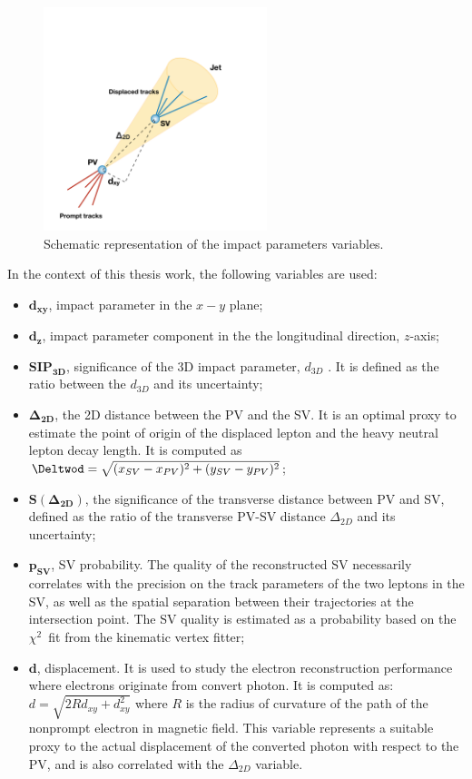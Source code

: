 \begin{figure}[h!]
\centering
  \includegraphics[clip,trim=1cm 0cm 3cm 4cm, width=0.58\textwidth]{Figures/c2/grafico.pdf}
  \caption{Schematic representation of the impact parameters variables.}
  \label{fig:impact}
\end{figure}

In the context of this thesis work, the following variables are used:
\begin{itemize}
\item $\boldsymbol{d_{xy}}$, impact parameter in the $x-y$ plane;
\item $\boldsymbol{d_z}$, impact parameter component in the the
  longitudinal direction, $z$-axis;
\item $\boldsymbol{SIP_{3D}}$, significance of the 3D impact parameter, $d_{3D}$
 . It is defined as the ratio between the $d_{3D}$ and its
  uncertainty; 
\item $\boldsymbol{\Delta_{2D}}$, the 2D distance between the PV and
  the SV. It is an optimal proxy to estimate the point of origin of the
displaced lepton and the heavy neutral lepton decay length. It is
computed as $\Deltwod = \sqrt{(x_{SV}-x_{PV})^{2} + (y_{SV}-y_{PV})^{2}}$;
\item $\boldsymbol{ S(\Delta_{2D})}$, the significance of the transverse distance
  between PV and SV, defined as the ratio of the transverse PV-SV
  distance $\Delta_{2D}$ and its uncertainty;
\item $\boldsymbol{ p_{SV}}$, SV probability. The quality of the reconstructed SV
  necessarily correlates with the precision on the track parameters of
  the two leptons in the SV, as well as the spatial separation between their
  trajectories at the intersection point. The SV quality is estimated as a probability based on the
$\chi^2$~fit from the kinematic vertex fitter;
\item $\boldsymbol{d}$, displacement. It is used to study the electron
  reconstruction performance where electrons originate from convert
  photon.
It is computed as: $d = \sqrt{2R d_{xy}+d_{xy}^2}$ where $R$ is the radius of curvature of
  the path of the nonprompt electron in magnetic field. This variable represents a suitable
  proxy to the actual displacement of the converted photon with
respect to the PV, and is also correlated with the $\Delta_{2D}$ variable.
\end{itemize}


